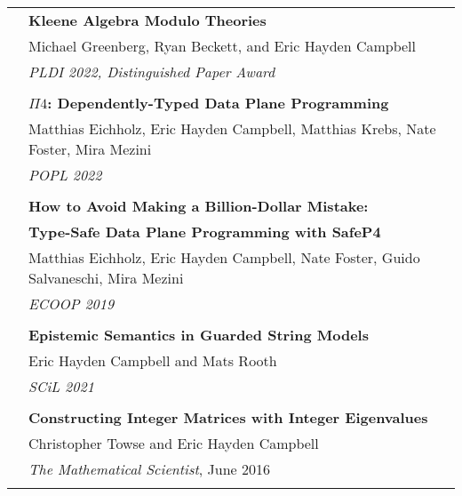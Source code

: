 \documentclass[letterpaper,10pt,oneside]{article}
\begin{document}
\begin{tabular}{@{} l l}
  & \textbf{Kleene Algebra Modulo Theories} \\
  & Michael Greenberg, Ryan Beckett, and Eric Hayden Campbell \\
  & \textit{PLDI 2022, Distinguished Paper Award} \\
  &\\

  & \textbf{$\Pi4$: Dependently-Typed Data Plane Programming} \\
  & Matthias Eichholz, Eric Hayden Campbell, Matthias Krebs, Nate Foster, Mira Mezini \\
  & \textit{POPL 2022}\\ & \\

  & \textbf{How to Avoid Making a Billion-Dollar Mistake:}\\
  & \textbf{Type-Safe Data Plane Programming with SafeP4} \\
  & Matthias Eichholz, Eric Hayden Campbell, Nate Foster, Guido Salvaneschi, Mira Mezini \\
  & \textit{ECOOP 2019} \\
  & \\
  & \textbf{Epistemic Semantics in Guarded String Models}\\
  & Eric Hayden Campbell and Mats Rooth \\
  & \textit{SCiL 2021} \\
  & \\


  & \textbf{Constructing Integer Matrices with Integer Eigenvalues} \\
  & Christopher Towse and Eric Hayden Campbell \\
  & \textit{The Mathematical Scientist}, June 2016 \\
  & \\

\end{tabular}
\end{document}
